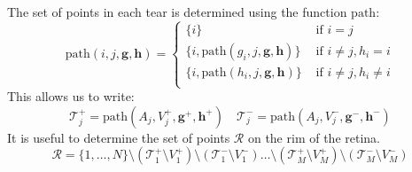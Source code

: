 \documentclass{article}
\renewcommand{\vec}[1]{\mathbf{#1}}
\begin{document}
The set of points in each tear is determined using the function
$\mathrm{path}$:
\begin{displaymath}
  \mathrm{path}(i, j, \vec{g}, \vec{h})  = \left\{ 
  \begin{array}{ll}
    \{i\} & \mbox{ if } i = j \\
      \{i, \mathrm{path}(g_i, j, \vec{g}, \vec{h})\} & \mbox{ if } i \ne j, h_i=i \\
      \{i, \mathrm{path}(h_i, j, \vec{g}, \vec{h})\}    & \mbox{ if } i \ne j, h_i\ne i \\
    \end{array}\right.
\end{displaymath}
This allows us to write:
\begin{displaymath}
  \mathcal{T}^+_j  = \mathrm{path}(A_j, V_j^+, \vec{g}^+, \vec{h}^+) \quad 
  \mathcal{T}^-_j  = \mathrm{path}(A_j, V_j^-, \vec{g}^-, \vec{h}^-)
\end{displaymath}
It is useful to determine the set of points $\mathcal{R}$ on the rim
of the retina.
\begin{displaymath}
  \mathcal{R} = \{1,\dots,N\} 
  \setminus (\mathcal{T}^+_1 \setminus V^+_1) 
  \setminus (\mathcal{T}^-_1 \setminus V^-_1)  
  \dots 
  \setminus (\mathcal{T}^+_M \setminus V^+_M)
  \setminus (\mathcal{T}^-_M \setminus V^-_M)
\end{displaymath}
\end{document}
